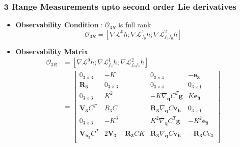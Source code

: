\documentclass[]{article}
\begin{document}
\begin{itemize}
\end{itemize}
\pagebreak
\subsubsection{3 Range Measurements upto second order Lie derivatives}
\begin{itemize}
	\item \textbf{Observability Condition} : $\mathcal{O}_{3R}$ is full rank
	\begin{equation*}
	\mathcal{O}_{3R} = [\nabla\mathcal{L}^0h;\nabla\mathcal{L}^1_{f_0}h;\nabla\mathcal{L}^2_{f_0f_0}h]
	\end{equation*}
	
	\item \textbf{Observability Matrix}
	\begin{align*}
	\mathcal{O}_{3R} &= [\nabla\mathcal{L}^0h;\nabla\mathcal{L}^1_{f_0}h;\nabla\mathcal{L}^2_{f_0f_0}h]\\ 
	&= \begin{bmatrix}
	0_{3\times 3}& -K& 0_{3\times 4}& -\bm{e_3}\\
	\bm{R_3} & 0_{3\times 3} & 0_{3\times 4} & 0_{3\times 1}\\
	0_{3\times 3}& K^2& -K\nabla_{\bm{q}} C^T\bm{g}& K\bm{e_3}\\
	\bm{V_3} C^T & R_3C & \bm{R_3}\nabla_{\bm{q}} C\bm{v_b} & 0_{3\times 1}\\
	0_{3\times 3}& -K^3& K^2\nabla_{\bm{q}} C^T\bm{g}& -K^2\bm{e_3}\\
	\bm{\dot{V}}_{\bm{b}_3} C^T & 2\bm{V}_3 - \bm{R_3}CK & \bm{R_3}\nabla_{\bm{q}} C\bm{\dot{v}_b} & -\bm{R_3}Ce_3\\
	\end{bmatrix}
	\end{align*}
	

\end{itemize}
\end{document}
